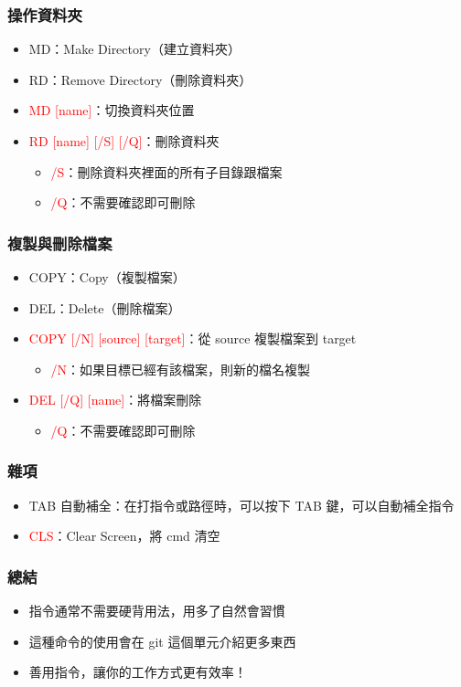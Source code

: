 \documentclass[mathserif]{beamer}
\begin{document}
\begin{frame}
    \frametitle{操作資料夾}
    \begin{itemize}
        \item MD：Make Directory（建立資料夾）
        \item RD：Remove Directory（刪除資料夾）
        \vspace{0.5cm}
        \item<2-> \textcolor{red}{MD [name]}：切換資料夾位置
        \item<2-> \textcolor{red}{RD [name] [/S] [/Q]}：刪除資料夾
        \begin{itemize}
            \item<2-> \textcolor{red}{/S}：刪除資料夾裡面的所有子目錄跟檔案
            \item<2-> \textcolor{red}{/Q}：不需要確認即可刪除
        \end{itemize}
    \end{itemize}
\end{frame}

\begin{frame}
    \frametitle{複製與刪除檔案}
    \begin{itemize}
        \item COPY：Copy（複製檔案）
        \item DEL：Delete（刪除檔案）
        \vspace{0.5cm}
        \item<2-> \textcolor{red}{COPY [/N] [source] [target]}：從 source 複製檔案到 target
        \begin{itemize}
            \item<2-> \textcolor{red}{/N}：如果目標已經有該檔案，則新的檔名複製
        \end{itemize}
        \item<2-> \textcolor{red}{DEL [/Q] [name]}：將檔案刪除
        \begin{itemize}
            \item<2-> \textcolor{red}{/Q}：不需要確認即可刪除
        \end{itemize}
    \end{itemize}
\end{frame}

\begin{frame}
    \frametitle{雜項}
    \begin{itemize}
        \item TAB 自動補全：在打指令或路徑時，可以按下 TAB 鍵，可以自動補全指令
        \item \textcolor{red}{CLS}：Clear Screen，將 cmd 清空
    \end{itemize}
\end{frame}

\begin{frame}
    \frametitle{總結}
    \begin{itemize}
        \item 指令通常不需要硬背用法，用多了自然會習慣
        \item 這種命令的使用會在 git 這個單元介紹更多東西
        \item 善用指令，讓你的工作方式更有效率！
    \end{itemize}
\end{frame}
\end{document}
